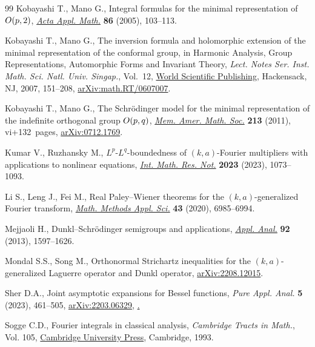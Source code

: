 \documentclass[10pt,a4paper]{article}
\numberwithin{equation}{section}
\begin{document}
\begin{thebibliography}{99}
Kobayashi T., Mano G., Integral formulas for the minimal representation of
 {${\rm O}(p,2)$}, \href{https://doi.org/10.1007/s10440-005-0464-2}{\textit{Acta Appl. Math.}} \textbf{86} (2005), 103--113.

Kobayashi T., Mano G., The inversion formula and holomorphic extension of the
 minimal representation of the conformal group, in Harmonic {A}nalysis,
 {G}roup {R}epresentations, {A}utomorphic {F}orms and {I}nvariant {T}heory,
 \textit{Lect. Notes Ser. Inst. Math. Sci. Natl. Univ. Singap.}, Vol.~12,
 \href{https://doi.org/10.1142/9789812770790_0006}{World Scientific Publishing}, Hackensack, NJ, 2007, 151--208,
 \href{https://arxiv.org/abs/math.RT/0607007}{arXiv:math.RT/0607007}.

Kobayashi T., Mano G., The {S}chr\"odinger model for the minimal representation
 of the indefinite orthogonal group {${\rm O}(p,q)$}, \href{https://doi.org/10.1090/S0065-9266-2011-00592-7}{\textit{Mem. Amer. Math.
 Soc.}} \textbf{213} (2011), vi+132~pages, \href{https://arxiv.org/abs/0712.1769}{arXiv:0712.1769}.

Kumar V., Ruzhansky M., {$L^p$}-{$L^q$}-boundedness of {$(k,a)$}-{F}ourier
 multipliers with applications to nonlinear equations, \href{https://doi.org/10.1093/imrn/rnab256}{\textit{Int. Math. Res.
 Not.}} \textbf{2023} (2023), 1073--1093.

Li S., Leng J., Fei M., Real {P}aley--{W}iener theorems for the
 {$(k,a)$}-generalized {F}ourier transform, \href{https://doi.org/10.1002/mma.6449}{\textit{Math. Methods Appl. Sci.}}
 \textbf{43} (2020), 6985--6994.

Mejjaoli H., Dunkl--{S}chr\"odinger semigroups and applications, \href{https://doi.org/10.1080/00036811.2012.692780}{\textit{Appl.
 Anal.}} \textbf{92} (2013), 1597--1626.

Mondal S.S., Song M., Orthonormal Strichartz inequalities for the
 {$(k,a)$}-generalized {L}aguerre operator and {D}unkl operator,
 \href{https://arxiv.org/abs/2208.12015}{arXiv:2208.12015}.

Sher D.A., Joint asymptotic expansions for {B}essel functions, \textit{Pure
 Appl. Anal.} \textbf{5} (2023), 461--505, \href{https://arxiv.org/abs/2203.06329}{arXiv:2203.06329},
 \href{https://doi.org/10.2140/paa.2023.5.461}.

Sogge C.D., Fourier integrals in classical analysis, \textit{Cambridge Tracts
 in Math.}, Vol. 105, \href{https://doi.org/10.1017/CBO9780511530029}{Cambridge University Press}, Cambridge, 1993.


\end{thebibliography}
\end{document}
